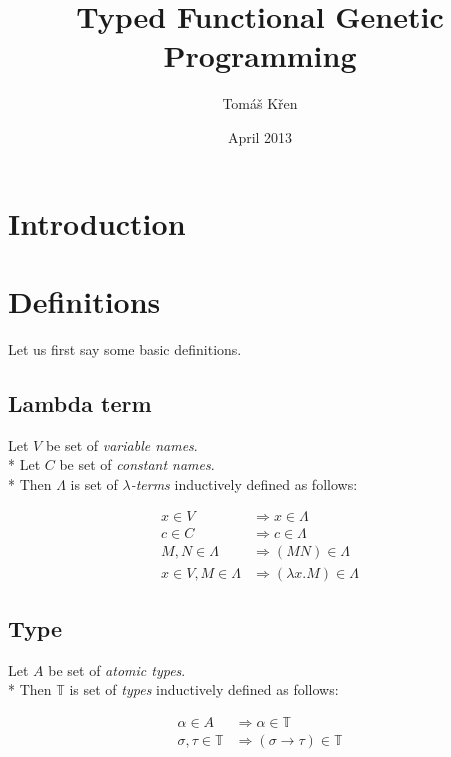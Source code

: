 \documentclass[12pt]{report}
\title{Typed Functional Genetic Programming}
\author{Tomáš Křen}
\date{April 2013}
\begin{document}
	\maketitle
	
	
\chapter{Introduction}

	
\chapter{Definitions}
	
	Let us first say some basic definitions.
		
	\section{Lambda term}
		
		Let $V$ be set of {\it variable names}.  \\* 
		Let $C$ be set of {\it constant names}.	 \\*		
		Then $\Lambda$ is set of {\it $\lambda$-terms} inductively defined as follows:
		
		\begin{align*}
			 x   \in V                 &\Rightarrow     x   \in \Lambda \\
			 c   \in C                 &\Rightarrow     c   \in \Lambda \\
			 M,N \in \Lambda           &\Rightarrow ( M N ) \in \Lambda \\
			 x   \in V , M \in \Lambda &\Rightarrow ( \lambda x . M ) \in \Lambda 
		\end{align*} 
	
	\section{Type}
	
		Let $A$ be set of {\it atomic types}. \\*
		Then $\mathbb{T}$ is set of {\it types} inductively defined as follows:
		
		\begin{align*}
		\alpha      \in A          &\Rightarrow     \alpha   \in \mathbb{T} \\
		\sigma,\tau \in \mathbb{T} &\Rightarrow ( \sigma \rightarrow  \tau ) \in \mathbb{T} 
		\end{align*} 
	
	
\end{document}

